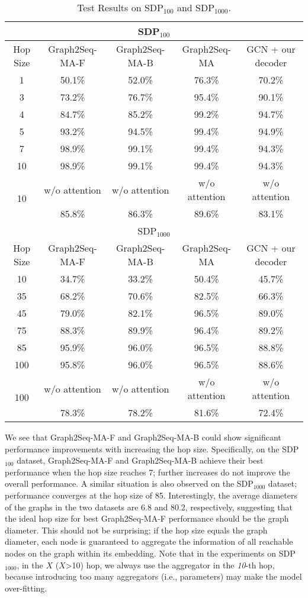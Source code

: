 \documentclass{article} \usepackage{iclr2019_conference,times}
\begin{document}
\begin{table}[t!]
\small
\centering
\begin{tabular}{ccccc}
\multicolumn{5}{c}{SDP$_{100}$} \\ 
\hline
Hop Size & Graph2Seq-MA-F & Graph2Seq-MA-B & Graph2Seq-MA & GCN \citep{kipf2016semi} + our decoder  \\
1 & 50.1\% & 52.0\% & 76.3\% & 70.2\% \\
3 & 73.2\% & 76.7\% & 95.4\% & 90.1\% \\
4 & 84.7\% & 85.2\% & 99.2\% & 94.7\% \\
5 & 93.2\% & 94.5\% & 99.4\% & 94.9\% \\
7 & 98.9\% & 99.1\% & 99.4\% & 94.3\% \\
10 & 98.9\% & 99.1\% & 99.4\% &  94.3\% \\
\hline
\multirow{2}{*}{10} & w/o attention & w/o attention & w/o attention & w/o attention \\
& 85.8\% & 86.3\% & 89.6\% & 83.1\% \\
\multicolumn{5}{c}{SDP$_{1000}$} \\ 
\hline
Hop Size & Graph2Seq-MA-F & Graph2Seq-MA-B & Graph2Seq-MA & GCN \citep{kipf2016semi} + our decoder  \\
10 & 34.7\% & 33.2\% & 50.4\% & 45.7\% \\
35 & 68.2\% & 70.6\% & 82.5\% & 66.3\% \\
45 & 79.0\% & 82.1\% & 96.5\% & 89.0\% \\
75 & 88.3\% & 89.9\% & 96.4\% & 89.2\% \\
85 & 95.9\% & 96.0\% & 96.5\% & 88.8\% \\
100 & 95.8\% & 96.0\% & 96.5\% & 88.6\% \\
\hline
\multirow{2}{*}{100} & w/o attention & w/o attention & w/o attention & w/o attention \\
& 78.3\% & 78.2\% & 81.6\% & 72.4\% \\
\hline
\end{tabular}
\caption{Test Results on SDP$_{100}$ and SDP$_{1000}$.}
\label{app:tab:results_hop_function}
\vspace{-0.7cm}
\end{table}

We see that Graph2Seq-MA-F and Graph2Seq-MA-B could show significant performance improvements with increasing the hop size.
Specifically, on the SDP$_{100}$ dataset, Graph2Seq-MA-F and Graph2Seq-MA-B achieve their best performance when the hop size reaches 7; further increases do not improve the overall performance.
A similar situation is also observed on the SDP$_{1000}$ dataset; performance converges at the hop size of 85.
Interestingly, the average diameters of the graphs in the two datasets are 6.8 and 80.2, respectively, suggesting that the ideal hop size for best Graph2Seq-MA-F performance should be the graph diameter. This should not be surprising; if the hop size equals the graph diameter,
each node is guaranteed to aggregate the information of all reachable nodes on the graph within its embedding. Note that in the experiments on SDP$_{1000}$, in the $X$ ($X$>10) hop, we always use the aggregator in the \textit{10}-th hop, because introducing too many aggregators (i.e., parameters) may make the model over-fitting.
\end{document}
